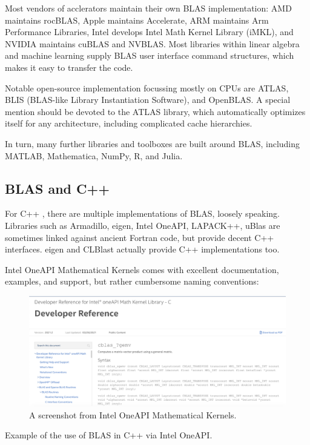 Most vendors of acclerators maintain their own BLAS 
 implementation:
 AMD maintains rocBLAS,
 Apple maintains Accelerate, 
 ARM maintains Arm Performance Libraries,
 Intel develops Intel Math Kernel Library (iMKL), and 
 NVIDIA maintains cuBLAS and NVBLAS.
Most libraries within linear algebra and machine learning
 supply BLAS user interface command structures, 
 which makes it easy to transfer the code.

Notable open-source implementation focussing 
mostly on CPUs are ATLAS, BLIS (BLAS-like Library Instantiation Software), and OpenBLAS.
A special mention should be devoted to the ATLAS library, 
which automatically optimizes itself for any architecture,
including complicated cache hierarchies. 

In turn, many further libraries and toolboxes are built 
around BLAS, including MATLAB, Mathematica, NumPy, R, 
and Julia.

\subsection{BLAS and C++}

For C++ , there are multiple implementations of BLAS, loosely speaking.
Libraries such as Armadillo, eigen, Intel OneAPI, LAPACK++, uBlas are 
sometimes linked against ancient Fortran code, but provide decent C++ interfaces. 
eigen and CLBlast actually provide C++ implementations too.

Intel OneAPI Mathematical Kernels comes with excellent documentation, 
examples, and support, but rather cumbersome naming conventions:

\begin{figure}[t!]
\includegraphics[width=\textwidth]{./static/blas01.png}
\caption{A screenshot from Intel OneAPI Mathematical Kernels.}
\label{blas01png}
\end{figure}

\begin{codebox}[breakable]{}
\footnotesize Example of the use of BLAS in C++ via Intel OneAPI.
\tcblower
{}
\end{codebox}

